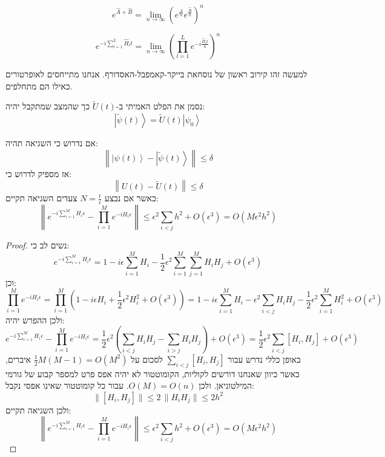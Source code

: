 \documentclass{tstextbook}
\begin{document}
\begin{proposition}
$$e^{\hat{A}+\hat{B}}=\operatorname*{lim}_{n\rightarrow\infty}\left(e^{\frac{\hat{A}}{n}}e^{\frac{\hat{B}}{n}}\right)^{n}$$

\end{proposition}
\begin{corollary}
$$e^{-i\sum_{l=1}^{L}\hat{H}_{l}t}=\operatorname*{lim}_{n\rightarrow\infty}\left(\prod_{l=1}^{L}e^{-i\frac{\hat{H}_{l}t}{n}}\right)^{n}$$

\end{corollary}
\begin{remark}
למעשה זהו קירוב ראשון של נוסחאת בייקר-קאמפבל-האסדורף. אנחנו מתייחסים לאופרטורים כאילו הם מתחלפים.

\end{remark}
\begin{symbolize}
נסמן את הפלט האמיתי ב-\(\widetilde{U}(t)\) כך שהמצב שמתקבל יהיה:
$$\left|\widetilde{\psi}\left(t\right)\right\rangle=\widetilde{U}\left(t\right)\left|\psi_{0}\right\rangle$$

\end{symbolize}
\begin{proposition}
אם נדרוש כי השגיאה תהיה:
$$\left\|\left|\psi\left(t\right)\right\rangle-\left|\widetilde{\psi}\left(t\right)\right\rangle\right\|\leq\delta$$
אז מספיק לדרוש כי:
$$\left\|U\left(t\right)-\widetilde{U}\left(t\right)\right\|\leq\delta$$
כאשר אם נבצע \(N=\frac{t}{\epsilon}\) צעדים השגיאה תקיים:
$$\left\|e^{-i\sum_{i=1}^{M}H_{i}\epsilon}-\prod_{i=1}^{M}e^{-i H_{i}\epsilon}\right\|\leq\epsilon^{2}\!\sum_{i<j}\!h^{2}+O\left(\epsilon^{3}\right)=O\left(M\epsilon^{2}h^{2}\right)$$

\end{proposition}
\begin{proof}
נשים לב כי:
$$e^{-i\sum\limits_{i=1}^{M}H_{i}\epsilon}=1-i\epsilon\sum\limits_{i=1}^{M}H_{i}-\frac{1}{2}\epsilon^{2}\sum\limits_{i=1}^{M}\sum\limits_{j=1}^{M}H_{i}H_{j}+O\left(\epsilon^{3}\right)$$
וכן:
$$\prod_{i=1}^{M}e^{-iH_{i}\epsilon}=\prod_{i=1}^{M}\left(1-i\epsilon H_{i}+\frac{1}{2}\epsilon^{2}H_{i}^{2}+O\left(\epsilon^{3}\right)\right)=1-i\epsilon\sum_{i=1}^{M}H_{i}-\epsilon^{2}\sum_{i<j}H_{i}H_{j}-\frac{1}{2}\epsilon^{2}\sum_{i=1}^{M}H_{i}^{2}+O\left(\epsilon^{3}\right)$$
ולכן ההפרש יהיה:
$$e^{-i\sum\limits_{i=1}^{M}H_{i}\epsilon}-\prod\limits_{i=1}^{M}e^{-iH_{i}\epsilon}=\frac{1}{2}\epsilon^{2}\left(\sum\limits_{i<j}H_{i}H_{j}-\sum\limits_{i>j}H_{i}H_{j}\right)+O\left(\epsilon^{3}\right)=\frac{1}{2}\epsilon^{2}\sum\limits_{i<j}\left[H_{i},H_{j}\right]+O\left(\epsilon^{3}\right)$$
באופן כללי נדרש עבור \(\sum\limits_{i<j}\left[H_{i},H_{j}\right]\) לסכום על \(\frac{1}{2}M(M-1)=O(M^{2})\) איברים, כאשר כיוון שאנחנו דורשים לקוליות, הקומוטטור לא יהיה אפס פרט למספר קבוע של גורמי המילטוניאן. ולכן \(O(M)=O(n)\). עבור כל קומוטטור שאינו אפסי נקבל:
$$\|[H_{i},H_{j}]\|\leq2\,\|H_{i}H_{j}\|\leq2h^{2}$$
ולכן השגיאה תקיים:
$$\left\|e^{-i\sum_{i=1}^{M}H_{i}\epsilon}-\prod_{i=1}^{M}e^{-i H_{i}\epsilon}\right\|\leq\epsilon^{2}\sum_{i<j}\!h^{2}+O\left(\epsilon^{3}\right)=O\left(M\epsilon^{2}h^{2}\right)$$

\end{proof}
\end{document}
